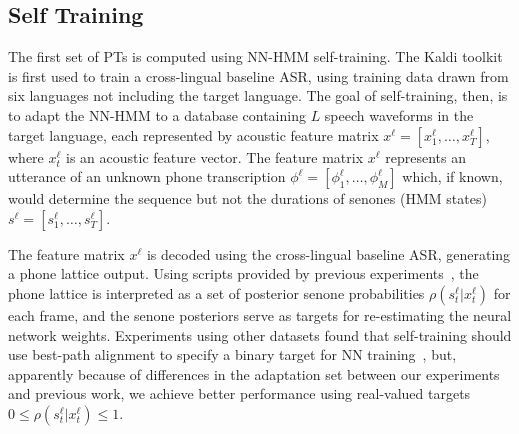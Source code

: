 \subsection{Self Training}
\label{sec:selftraining}

The first set of PTs is computed using NN-HMM self-training.
The Kaldi toolkit~\cite{Kaldi2011} is first used to train a
cross-lingual baseline ASR, using training data drawn from six
languages not including the target language.  The goal of
self-training, then, is to adapt the NN-HMM to a database containing
$L$ speech waveforms in the target language, each represented by
acoustic feature matrix $x^\ell =[x_1^\ell,\ldots,x_T^\ell]$, where
$x_t^\ell$ is an acoustic feature vector.  The feature matrix $x^\ell$
represents an utterance of an unknown phone transcription
$\phi^\ell=[\phi_1^\ell,\ldots,\phi_M^\ell]$ which, if known, would
determine the sequence but not the durations of senones (HMM states)
$s^\ell =[s_1^\ell,\ldots,s_T^\ell]$.

The feature matrix $x^\ell$ is decoded using the cross-lingual
baseline ASR, generating a phone lattice output.  Using scripts
provided by previous experiments~\cite{vesely2013-semi}, the phone
lattice is interpreted as a set of posterior senone probabilities
$\rho(s_t^\ell|x_t^\ell)$ for each frame, and the senone posteriors
serve as targets for re-estimating the neural network weights.
Experiments using other datasets found that self-training
should use best-path alignment to specify a binary target for NN
training~\cite{vesely2013-semi}, but, apparently because of
differences in the adaptation set between our experiments and previous
work, we achieve better performance using real-valued targets
$0\le\rho(s_t^\ell|x_t^\ell)\le 1$.
